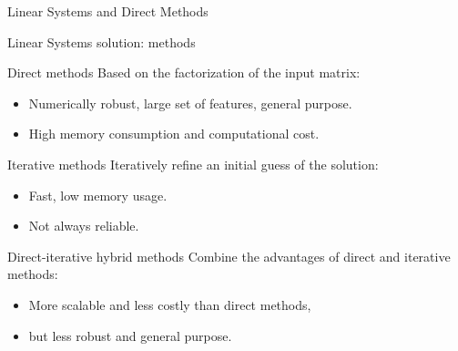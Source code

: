 \begin{frame}{Linear Systems and Direct Methods}
\begin{center}

  \end{center}

\end{frame}

\begin{frame}{Linear Systems solution: methods}

  \begin{block}{Direct methods}
    Based on the factorization of the input matrix:

    \begin{itemize}
    \item[\dg{$\blacktriangle$}] Numerically robust, large set of
      features, general purpose.
    \item[\dr{$\blacktriangledown$}] High memory consumption and
      computational cost.
    \end{itemize}
  \end{block}

  \begin{block}{Iterative methods}
    Iteratively refine an initial guess of the solution:

    \begin{itemize}
    \item[\dg{$\blacktriangle$}] Fast, low memory usage.
    \item[\dr{$\blacktriangledown$}] Not always reliable.
    \end{itemize}
  \end{block}

  \begin{block}{Direct-iterative hybrid methods}
    Combine the advantages of direct and iterative methods:
    \begin{itemize}
    \item[\dg{$\blacktriangle$}] More scalable and less costly than direct methods, 
    \item[\dr{$\blacktriangledown$}]  but less robust and general purpose.
    \end{itemize}
  \end{block}


\end{frame}
